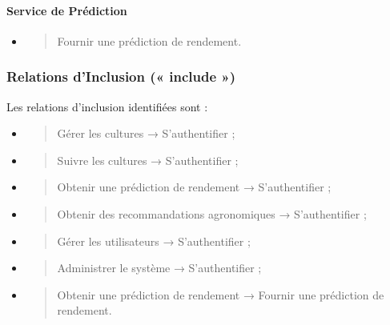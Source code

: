 \documentclass[
]{article}
\begin{document}
\hypertarget{service-de-pruxe9diction-1}{%
\paragraph{Service de Prédiction}\label{service-de-pruxe9diction-1}}

\begin{itemize}
\item
  \begin{quote}
  Fournir une prédiction de rendement.
  \end{quote}
\end{itemize}

\hypertarget{relations-dinclusion-include}{%
\subsubsection{Relations d'Inclusion (« include
»)}\label{relations-dinclusion-include}}

Les relations d'inclusion identifiées sont :

\begin{itemize}
\item
  \begin{quote}
  Gérer les cultures → S'authentifier ;
  \end{quote}
\item
  \begin{quote}
  Suivre les cultures → S'authentifier ;
  \end{quote}
\item
  \begin{quote}
  Obtenir une prédiction de rendement → S'authentifier ;
  \end{quote}
\item
  \begin{quote}
  Obtenir des recommandations agronomiques → S'authentifier ;
  \end{quote}
\item
  \begin{quote}
  Gérer les utilisateurs → S'authentifier ;
  \end{quote}
\item
  \begin{quote}
  Administrer le système → S'authentifier ;
  \end{quote}
\item
  \begin{quote}
  Obtenir une prédiction de rendement → Fournir une prédiction de
  rendement.
  \end{quote}
\end{itemize}
\end{document}
